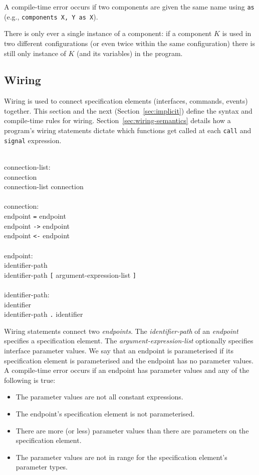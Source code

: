 \documentclass[11pt]{article}
\newcommand{\kw}[1]{{\tt #1}}
\newcommand{\code}[1]{{\tt #1}}
\begin{document}
A compile-time error occurs if two components are given the same name using \kw{as} (e.g., \code{components X, Y as X}).

There is only ever a single instance of a component: if a component $K$
is used in two different configurations (or even twice within the same
configuration) there is still only instance of $K$ (and its variables)
in the program.

\subsection{Wiring}
\label{sec:wiring}

Wiring is used to connect specification elements (interfaces, commands,
events) together. This section and the next (Section~\ref{sec:implicit})
define the syntax and compile-time rules for
wiring. Section~\ref{sec:wiring-semantics} details how a program's wiring
statements dictate which functions get called at each \kw{call} and
\kw{signal} expression.  \em \begin{tabbing}
\hspace*{2cm}\= \\ \kill
connection-list:\\
\>	connection\\
\>	connection-list connection\\
\\
connection:\\
\>	endpoint \kw{=} endpoint\\
\>	endpoint \kw{->} endpoint\\
\>	endpoint \kw{<-} endpoint\\
\\
endpoint:\\
\>	identifier-path \\
\>	identifier-path \kw{[} argument-expression-list \kw{]}\\
\\
identifier-path:\\
\>	identifier\\
\>	identifier-path \kw{.} identifier\\
\end{tabbing} \rm


Wiring statements connect two \emph{endpoints}. The \emph{identifier-path}
of an \emph{endpoint} specifies a specification element. The
\emph{argument-expression-list} optionally specifies interface parameter
values. We say that an endpoint is parameterised if its specification
element is parameterised and the endpoint has no parameter values. A
compile-time error occurs if an endpoint has parameter values and any of
the following is true:
\begin{itemize}
\item The parameter values are not all constant expressions.
\item The endpoint's specification element is not parameterised.
\item There are more (or less) parameter values than there are parameters
on the specification element.
\item The parameter values are not in range for the specification element's
parameter types.
\end{itemize}
\end{document}
